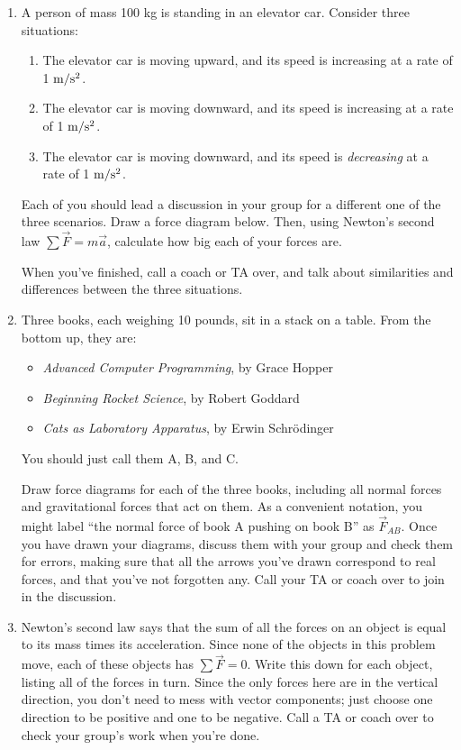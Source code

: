 \documentclass[12pt]{article}
\newcommand{\BI}{\begin{itemize}}
\newcommand{\EI}{\end{itemize}}
\newcommand{\vsi}{\vspace{1in}}
\newcommand{\mss}{$\rm m/\rm s^2$}
\begin{document}
\begin{enumerate}

  \item A person of mass 100 kg is standing in an elevator car. Consider three situations:
    \begin{enumerate}
      \item The elevator car is moving upward, and its speed is increasing at a rate of 1 \mss.
      \item The elevator car is moving downward, and its speed is increasing at a rate of 1 \mss.
      \item The elevator car is moving downward, and its speed is {\it decreasing} at a rate of 1 \mss.
    \end{enumerate}

    Each of you should lead a discussion in your group for a different one of the three scenarios. Draw a force diagram below. Then, using Newton's second law
    $\sum \vec F = m \vec a$, calculate how big each of your forces are.

\vsi\vsi\vsi\vsi

    When you've finished, call a coach or TA over, and talk about similarities and differences between the three situations. 


\newpage


\item Three books, each weighing 10 pounds, sit in a stack on a table. From the bottom up, they are:
  \BI
\item {\it Advanced Computer Programming}, by Grace Hopper
\item {\it Beginning Rocket Science}, by Robert Goddard
\item {\it Cats as Laboratory Apparatus}, by Erwin Schr\"odinger
  \EI
     
     You should just call them A, B, and C. 

     Draw force diagrams for each of the three books, including all normal forces and gravitational forces that act on them. As a convenient notation, you might label ``the normal force of book A pushing on book B'' as $\vec F_{AB}$.
Once you have drawn your diagrams, discuss them with your group and check them for errors, making sure that all the arrows you've drawn correspond to real forces, and that you've not forgotten any. Call your TA or coach over to 
join in the discussion.

\vsi\vsi\vsi

\item Newton's second law says that the sum of all the forces on an object is equal to its mass times its acceleration. Since none of the objects in this problem move, each of these objects has $\sum \vec F = 0$. Write this down
for each object, listing all of the forces in turn. Since the only forces here are in the vertical direction, you don't need to mess with vector components; just choose one direction to be positive and one to be negative. Call a 
TA or coach over to check your group's work when you're done.


\end{enumerate}
\end{document}
